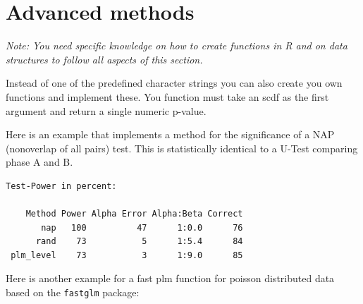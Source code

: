 \documentclass[
  letterpaper,
  DIV=11,
  numbers=noendperiod]{scrreprt}
\newenvironment{Shaded}{\begin{snugshade}}{\end{snugshade}}
\newcommand{\AttributeTok}[1]{\textcolor[rgb]{0.40,0.45,0.13}{#1}}
\newcommand{\CommentTok}[1]{\textcolor[rgb]{0.37,0.37,0.37}{#1}}
\newcommand{\ControlFlowTok}[1]{\textcolor[rgb]{0.00,0.23,0.31}{#1}}
\newcommand{\DecValTok}[1]{\textcolor[rgb]{0.68,0.00,0.00}{#1}}
\newcommand{\FunctionTok}[1]{\textcolor[rgb]{0.28,0.35,0.67}{#1}}
\newcommand{\NormalTok}[1]{\textcolor[rgb]{0.00,0.23,0.31}{#1}}
\newcommand{\OtherTok}[1]{\textcolor[rgb]{0.00,0.23,0.31}{#1}}
\newcommand{\SpecialCharTok}[1]{\textcolor[rgb]{0.37,0.37,0.37}{#1}}
\newcommand{\StringTok}[1]{\textcolor[rgb]{0.13,0.47,0.30}{#1}}
\begin{document}
\hypertarget{advanced-methods}{%
\section{Advanced methods}\label{advanced-methods}}

\emph{Note: You need specific knowledge on how to create functions in R
and on data structures to follow all aspects of this section.}

Instead of one of the predefined character strings you can also create
you own functions and implement these. You function must take an scdf as
the first argument and return a single numeric p-value.

Here is an example that implements a method for the significance of a
NAP (nonoverlap of all pairs) test. This is statistically identical to a
U-Test comparing phase A and B.

\begin{Shaded}
\end{Shaded}

\begin{verbatim}
Test-Power in percent:

    Method Power Alpha Error Alpha:Beta Correct
       nap   100          47      1:0.0      76
      rand    73           5      1:5.4      84
 plm_level    73           3      1:9.0      85
\end{verbatim}

Here is another example for a fast plm function for poisson distributed
data based on the \texttt{fastglm} package:
\end{document}
